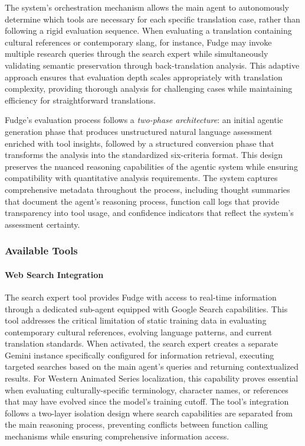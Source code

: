 \documentclass[conference]{IEEEtran}
\begin{document}
The system's orchestration mechanism allows the main agent to autonomously determine which tools are necessary for each specific translation case, rather than following a rigid evaluation sequence. When evaluating a translation containing cultural references or contemporary slang, for instance, Fudge may invoke multiple research queries through the search expert while simultaneously validating semantic preservation through back-translation analysis. This adaptive approach ensures that evaluation depth scales appropriately with translation complexity, providing thorough analysis for challenging cases while maintaining efficiency for straightforward translations.

Fudge's evaluation process follows a \textit{two-phase architecture}: an initial agentic generation phase that produces unstructured natural language assessment enriched with tool insights, followed by a structured conversion phase that transforms the analysis into the standardized six-criteria format. This design preserves the nuanced reasoning capabilities of the agentic system while ensuring compatibility with quantitative analysis requirements. The system captures comprehensive metadata throughout the process, including thought summaries that document the agent's reasoning process, function call logs that provide transparency into tool usage, and confidence indicators that reflect the system's assessment certainty.

\subsubsection{Available Tools}

\paragraph{Web Search Integration} The search expert tool provides Fudge with access to real-time information through a dedicated sub-agent equipped with Google Search capabilities. This tool addresses the critical limitation of static training data in evaluating contemporary cultural references, evolving language patterns, and current translation standards. When activated, the search expert creates a separate Gemini instance specifically configured for information retrieval, executing targeted searches based on the main agent's queries and returning contextualized results. For Western Animated Series localization, this capability proves essential when evaluating culturally-specific terminology, character names, or references that may have evolved since the model's training cutoff. The tool's integration follows a two-layer isolation design where search capabilities are separated from the main reasoning process, preventing conflicts between function calling mechanisms while ensuring comprehensive information access.
\end{document}
